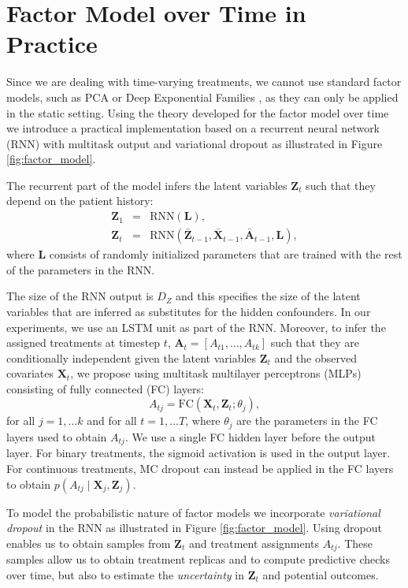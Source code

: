 \documentclass{article}
\newcommand{\vc}[1]{\mathbf{#1}}
\newcommand{\hist}[1]{\bar{\vc{#1}}}
\begin{document}
	
	\section{Factor Model over Time in Practice} \label{sec:factor_model_implementation}
	
	Since we are dealing with time-varying treatments, we cannot use standard factor models, such as PCA \citep{tipping1999probabilistic} or Deep Exponential Families \citep{ranganath2015deep}, as they can only be applied in the static setting. Using the theory developed for the factor model over time we introduce a practical implementation based on a recurrent neural network (RNN) with multitask output and variational dropout as illustrated in Figure \ref{fig:factor_model}. 
	
	The recurrent part of the model infers the latent variables $\vc{Z}_t$ such that they depend on the patient history: 
	\begin{eqnarray}
    \vc{Z}_1 &=& \text{RNN}(\vc{L}), \\
    \vc{Z}_t &=& \text{RNN}(\hist{Z}_{t-1}, \hist{X}_{t-1}, \hist{A}_{t-1}, \vc{L}),
    \end{eqnarray}
    where $\vc{L}$ consists of randomly initialized  parameters that are trained with the rest of the parameters in the RNN. 
    
    The size of the RNN output is $D_Z$ and this specifies the size of the latent variables that are inferred as substitutes for the hidden confounders. In our experiments, we use an LSTM unit \citep{hochreiter1997long} as part of the RNN. Moreover, to infer the assigned treatments at timestep $t$, $\vc{A}_t = [A_{t1}, \dots, A_{tk}]$ such that they are conditionally independent given the latent variables $\vc{Z}_t$ and the observed covariates $\vc{X}_t$, we propose using multitask multilayer perceptrons (MLPs) consisting of fully connected (FC) layers: 
    \begin{equation}
    A_{tj} = \text{FC} (\vc{X}_t, \vc{Z}_t; \theta_j), 
    \end{equation} 
	for all $j = 1, \dots k$ and for all $t = 1, \dots T$, where $\theta_j$ are the parameters in the FC layers used to obtain $A_{tj}$. We use a single FC hidden layer before the output layer.  For binary treatments, the sigmoid activation is used in the output layer. For continuous treatments, MC dropout \citep{gal2016dropout} can instead be applied in the FC layers to obtain $p(A_{tj} \mid \vc{X}_j, \vc{Z}_j)$. 
	
	To model the probabilistic nature of factor models we incorporate \textit{variational dropout} \citep{gal2016theoretically} in the RNN as illustrated in Figure  \ref{fig:factor_model}. Using dropout enables us to obtain samples from $\vc{Z}_t$ and treatment assignments $A_{tj}$.  These samples allow us to obtain treatment replicas and to compute predictive checks over time, but also to estimate the \textit{uncertainty} in $\vc{Z}_t$ and potential outcomes. 
	
\end{document}
